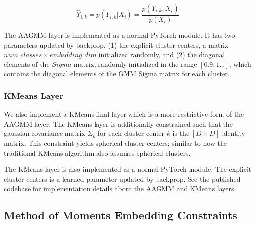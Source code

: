 \documentclass[10pt,twocolumn,letterpaper]{article}
\begin{document}
\begin{equation}
	\hat{Y}_{i,k} = p(Y_{i,k}|X_i) = \frac{p(Y_{i,k}, X_i)}{p(X_i)}
\end{equation}

The AAGMM layer is implemented as a normal PyTorch \cite{pytorch} module.
It has two parameters updated by backprop.
(1) the explicit cluster centers, a matrix $num\_classes \times embedding\_dim$ initialized randomly, and
(2) the diagonal elements of the $Sigma$ matrix, randomly initialized in the range $[0.9, 1.1]$, which contains the diagonal elements of the GMM Sigma matrix for each cluster.

\subsubsection{KMeans Layer}

We also implement a KMeans final layer which is a more restrictive form of the AAGMM layer.
The KMeans layer is additionally constrained such that the gaussian covariance matrix $\Sigma_k$ for each cluster center $k$ is the $[D \times D]$ identity matrix. 
This constraint yields spherical cluster centers; similar to how the traditional KMeans algorithm also assumes spherical clusters.


The KMeans layer is also implemented as a normal PyTorch \cite{pytorch} module.
The explicit cluster centers is a learned parameter updated by backprop.
See the published codebase for implementation details about the AAGMM and KMeans layers.


\subsection{Method of Moments Embedding Constraints}
\end{document}
